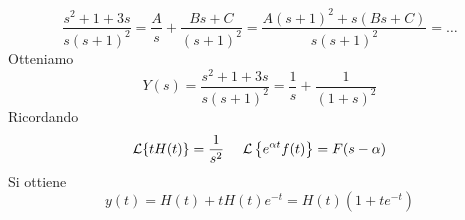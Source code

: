 \begin{equation*}
\frac{s^{2} +1+3s}{s( s+1)^{2}} =\frac{A}{s} +\frac{Bs+C}{( s+1)^{2}} =\frac{A( s+1)^{2} +s( Bs+C)}{s( s+1)^{2}} =\dotsc 
\end{equation*}
Otteniamo
\begin{equation*}
Y( s) =\frac{s^{2} +1+3s}{s( s+1)^{2}} =\frac{1}{s} +\frac{1}{( 1+s)^{2}}
\end{equation*}
Ricordando
\begin{equation*}
\Lc\{tH( t)\} =\frac{1}{s^{2}} \ \ \ \ \Lc\left\{e^{\alpha t} f( t)\right\} =F( s-\alpha )
\end{equation*}
Si ottiene
\begin{equation*}
y( t) =H( t) +tH( t) e^{-t} =H( t)\left( 1+te^{-t}\right)
\end{equation*}
\Soluzione

